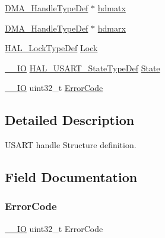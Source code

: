 \begin{DoxyCompactItemize}
\item 
\hyperlink{group___d_m_a___exported___types_ga92b907d56a9c29b93d46782a7a04f91e}{D\+M\+A\+\_\+\+Handle\+Type\+Def} $\ast$ \hyperlink{struct_u_s_a_r_t___handle_type_def_a33e13c28b1a70e6164417abb026d7a22}{hdmatx}
\item 
\hyperlink{group___d_m_a___exported___types_ga92b907d56a9c29b93d46782a7a04f91e}{D\+M\+A\+\_\+\+Handle\+Type\+Def} $\ast$ \hyperlink{struct_u_s_a_r_t___handle_type_def_abd0aeec20298a55d89a440320e35634f}{hdmarx}
\item 
\hyperlink{stm32f0xx__hal__def_8h_ab367482e943333a1299294eadaad284b}{H\+A\+L\+\_\+\+Lock\+Type\+Def} \hyperlink{struct_u_s_a_r_t___handle_type_def_ad4cf225029dbefe8d3fe660c33b8bb6b}{Lock}
\item 
\hyperlink{core__sc300_8h_aec43007d9998a0a0e01faede4133d6be}{\+\_\+\+\_\+\+IO} \hyperlink{group___u_s_a_r_t___exported___types_ga502e7abdfa6b24f0f6b40cf60c7383c5}{H\+A\+L\+\_\+\+U\+S\+A\+R\+T\+\_\+\+State\+Type\+Def} \hyperlink{struct_u_s_a_r_t___handle_type_def_a9f34f91ce6e926e30e09bc087a5f8d4e}{State}
\item 
\hyperlink{core__sc300_8h_aec43007d9998a0a0e01faede4133d6be}{\+\_\+\+\_\+\+IO} uint32\+\_\+t \hyperlink{struct_u_s_a_r_t___handle_type_def_a123c5063e6a3b1901b2fbe5f88c53a7e}{Error\+Code}
\end{DoxyCompactItemize}


\subsection{Detailed Description}
U\+S\+A\+RT handle Structure definition. 

\subsection{Field Documentation}
\mbox{\label{struct_u_s_a_r_t___handle_type_def_a123c5063e6a3b1901b2fbe5f88c53a7e}} 
\subsubsection{\texorpdfstring{Error\+Code}{ErrorCode}}
{\footnotesize\ttfamily \hyperlink{core__sc300_8h_aec43007d9998a0a0e01faede4133d6be}{\+\_\+\+\_\+\+IO} uint32\+\_\+t Error\+Code}

